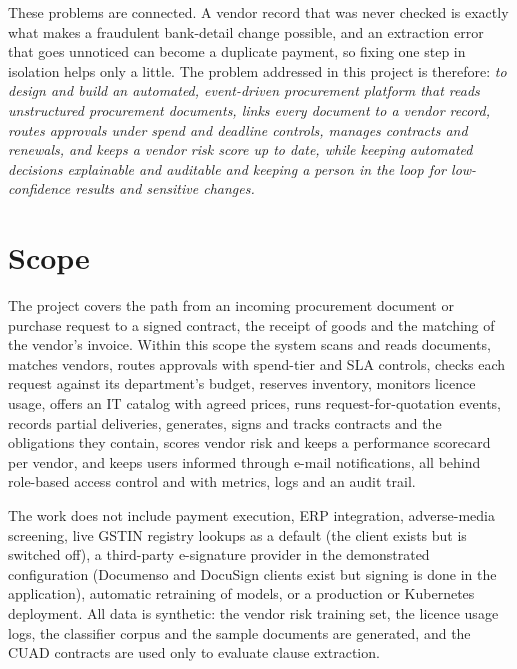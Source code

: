 These problems are connected. A vendor record that was never checked is exactly what makes a fraudulent bank-detail change possible, and an extraction error that goes unnoticed can become a duplicate payment, so fixing one step in isolation helps only a little. The problem addressed in this project is therefore: \textit{to design and build an automated, event-driven procurement platform that reads unstructured procurement documents, links every document to a vendor record, routes approvals under spend and deadline controls, manages contracts and renewals, and keeps a vendor risk score up to date, while keeping automated decisions explainable and auditable and keeping a person in the loop for low-confidence results and sensitive changes.}

\section{Scope}\label{sec:scope3}
The project covers the path from an incoming procurement document or purchase request to a signed contract, the receipt of goods and the matching of the vendor's invoice. Within this scope the system scans and reads documents, matches vendors, routes approvals with spend-tier and SLA controls, checks each request against its department's budget, reserves inventory, monitors licence usage, offers an IT catalog with agreed prices, runs request-for-quotation events, records partial deliveries, generates, signs and tracks contracts and the obligations they contain, scores vendor risk and keeps a performance scorecard per vendor, and keeps users informed through e-mail notifications, all behind role-based access control and with metrics, logs and an audit trail.

The work does not include payment execution, ERP integration, adverse-media screening, live GSTIN registry lookups as a default (the client exists but is switched off), a third-party e-signature provider in the demonstrated configuration (Documenso and DocuSign clients exist but signing is done in the application), automatic retraining of models, or a production or Kubernetes deployment. All data is synthetic: the vendor risk training set, the licence usage logs, the classifier corpus and the sample documents are generated, and the CUAD contracts are used only to evaluate clause extraction.


